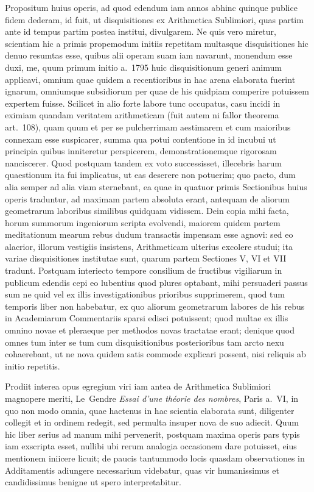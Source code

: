 \documentclass[12pt,a4paper]{article}
\theoremstyle{plain}
\theoremstyle{definition}
\theoremstyle{remark}
\begin{document}
Propositum huius operis, ad quod edendum iam annos abhinc quinque publice fidem dederam, id fuit, ut disquisitiones ex Arithmetica Sublimiori, quas partim ante id tempus partim postea institui, divulgarem. Ne quis vero miretur, scientiam hic a primis propemodum initiis repetitam multasque disquisitiones hic denuo resumtas esse, quibus alii operam suam iam navarunt, monendum esse duxi, me, quum primum initio a.\ 1795 huic disquisitionum generi animum applicavi, omnium quae quidem a recentioribus in hac arena elaborata fuerint ignarum, omniumque subsidiorum per quae de his quidpiam comperire potuissem expertem fuisse. Scilicet in alio forte labore tunc occupatus, casu incidi in eximiam quandam veritatem arithmeticam (fuit autem ni fallor theorema art.~108), quam quum et per se pulcherrimam aestimarem et cum maioribus connexam esse suspicarer, summa qua potui contentione in id incubui ut principia quibus inniteretur perspicerem, demonstrationemque rigorosam nanciscerer. Quod postquam tandem ex voto successisset, illecebris harum quaestionum ita fui implicatus, ut eas deserere non potuerim; quo pacto, dum alia semper ad alia viam sternebant, ea quae in quatuor primis Sectionibus huius operis traduntur, ad maximam partem absoluta erant, antequam de aliorum geometrarum laboribus similibus quidquam vidissem. Dein copia mihi facta, horum summorum ingeniorum scripta evolvendi, maiorem quidem partem meditationum mearum rebus dudum transactis impensam esse agnovi: sed eo alacrior, illorum vestigiis insistens, Arithmeticam ulterius excolere studui; ita variae disquisitiones institutae sunt, quarum partem Sectiones V, VI et VII tradunt. Postquam interiecto tempore consilium de fructibus vigiliarum in publicum edendis cepi eo lubentius quod plures optabant, mihi persuaderi passus sum ne quid vel ex illis investigationibus prioribus supprimerem, quod tum temporis liber non habebatur, ex quo aliorum geometrarum labores de his rebus in Academiarum Commentariis sparsi edisci potuissent; quod multae ex illis omnino novae et pleraeque per methodos novas tractatae erant; denique quod omnes tum inter se tum cum disquisitionibus posterioribus tam arcto nexu cohaerebant, ut ne nova quidem satis commode explicari possent, nisi reliquis ab initio repetitis.

Prodiit interea opus egregium viri iam antea de Arithmetica Sublimiori magnopere meriti, Le~Gendre \textit{Essai d'une théorie des nombres}, Paris a.~VI, in quo non modo omnia, quae hactenus in hac scientia elaborata sunt, diligenter collegit et in ordinem redegit, sed permulta insuper nova de suo adiecit. Quum hic liber serius ad manum mihi pervenerit, postquam maxima operis pars typis iam exscripta esset, nullibi ubi rerum analogia occasionem dare potuisset, eius mentionem iniicere licuit; de paucis tantummodo locis quasdam observationes in Additamentis adiungere necessarium videbatur, quas vir humanissimus et candidissimus benigne ut spero interpretabitur.
\end{document}
